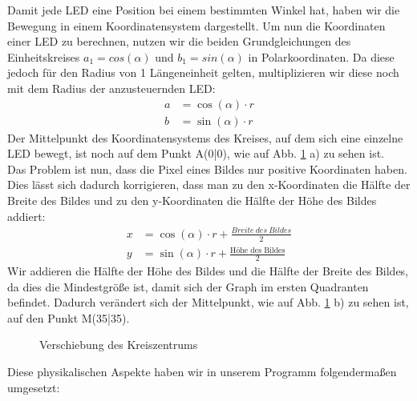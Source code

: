 \documentclass [a4paper, 11pt] {article}
\begin{document}
Damit jede LED eine Position bei einem bestimmten Winkel hat, haben wir die Bewegung in einem Koordinatensystem dargestellt. Um nun die Koordinaten einer LED zu berechnen, nutzen wir die beiden Grundgleichungen des Einheitskreises $a_1 = cos(\alpha)$ und
$b_1 = sin(\alpha)$ in Polarkoordinaten. Da diese jedoch für den Radius von 1 Längeneinheit gelten, multiplizieren wir diese noch mit dem Radius der anzusteuernden LED:
\begin{align}
a &= \cos (\alpha) \cdot r \\
b &= \sin (\alpha) \cdot r 
\end{align}
Der Mittelpunkt des Koordinatensystems des Kreises, auf dem sich eine einzelne LED bewegt, ist noch auf dem Punkt A(0\big|0), wie auf Abb. \ref{dia} a) zu sehen ist. \\
Das Problem ist nun, dass die Pixel eines Bildes nur positive Koordinaten haben. Dies lässt sich dadurch korrigieren, dass man zu den x-Koordinaten die Hälfte der Breite des Bildes und zu den y-Koordinaten die Hälfte der Höhe des Bildes addiert:
\begin{align}
x &= \cos (\alpha) \cdot r + \frac{Breite \ des \ Bildes}{2} \\
y &= \sin (\alpha) \cdot r +  \frac{\text{Höhe\ des\ Bildes}}{2}
\end{align}
Wir addieren die Hälfte der Höhe des Bildes und die Hälfte der Breite des Bildes, da dies die Mindestgröße ist, damit sich der Graph im ersten Quadranten befindet. Dadurch verändert sich der Mittelpunkt, wie auf Abb. \ref{dia} b) zu sehen ist, auf den Punkt M(35\big|35).
\begin{figure}[H]
\centering
{}
\hspace{0.15\textwidth} 
\caption{Verschiebung des Kreiszentrums}
\label{dia}
\end{figure}
Diese physikalischen Aspekte haben wir in unserem Programm folgendermaßen umgesetzt:
\end{document}
